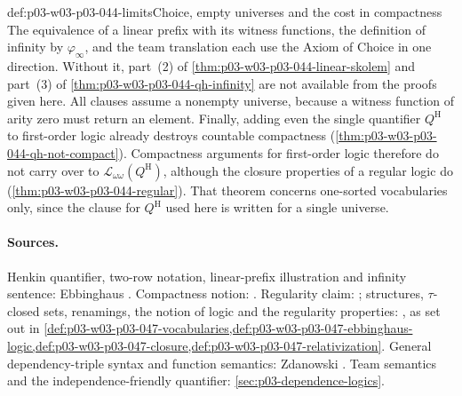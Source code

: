 \begin{hbwarning}{def:p03-w03-p03-044-limits}{Choice, empty universes and the cost in compactness}
The equivalence of a linear prefix with its witness functions, the
definition of infinity by \(\varphi_\infty\), and the team translation each
use the Axiom of Choice in one direction.  Without it, part~(2) of
\cref{thm:p03-w03-p03-044-linear-skolem} and part~(3) of
\cref{thm:p03-w03-p03-044-qh-infinity} are not available from the proofs
given here.  All clauses assume a nonempty universe, because a witness
function of arity zero must return an element.  Finally, adding even the
single quantifier \(Q^{\mathrm H}\) to first-order logic already destroys
countable compactness (\cref{thm:p03-w03-p03-044-qh-not-compact}).
Compactness arguments for first-order logic therefore do not carry over to
\(\mathscr L_{\omega\omega}(Q^{\mathrm H})\), although the closure
properties of a regular logic do
(\cref{thm:p03-w03-p03-044-regular}).  That theorem concerns one-sorted
vocabularies only, since the clause for \(Q^{\mathrm H}\) used here is
written for a single universe.
\end{hbwarning}

\paragraph{Sources.}
Henkin quantifier, two-row notation, linear-prefix illustration and
infinity sentence: Ebbinghaus
\cite[Ch.~II, Section~2.5, pp.~38--39]{Ebbinghaus1985ExtendedLogics}.
Compactness notion:
\cite[Ch.~II, Definition~1.2.4, p.~31]{Ebbinghaus1985ExtendedLogics}.
Regularity claim: \cite[p.~39]{Ebbinghaus1985ExtendedLogics}; structures,
\(\tau\)-closed sets, renamings, the notion of logic and the regularity
properties:
\cite[Ch.~II, \S1.1, pp.~27--28, and Definitions~1.2.1--1.2.3, pp.~29--31]{Ebbinghaus1985ExtendedLogics},
as set out in \cref{def:p03-w03-p03-047-vocabularies,def:p03-w03-p03-047-ebbinghaus-logic,def:p03-w03-p03-047-closure,def:p03-w03-p03-047-relativization}.
General dependency-triple syntax and function semantics: Zdanowski
\cite[Section~2, pp.~2--3]{Zdanowski2016HenkinArxiv}.  Team semantics and
the independence-friendly quantifier: \cref{sec:p03-dependence-logics}.
